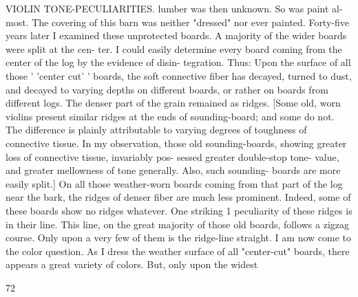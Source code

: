 \documentclass{article}
\begin{document}
VIOLIN TONE-PECULIARITIES. lumber was then unknown. So was paint al- most. The covering of this barn was neither "dressed" nor ever painted. Forty-five years later I examined these unprotected boards. A majority of the wider boards were split at the cen- ter. I could easily determine every board coming from the center of the log by the evidence of disin- tegration. Thus: Upon the surface of all those ' 'center cut' ' boards, the soft connective fiber has decayed, turned to dust, and decayed to varying depths on different boards, or rather on boards from different logs. The denser part of the grain remained as ridges. [Some old, worn violins present similar ridges at the ends of sounding-board; and some do not. The difference is plainly attributable to varying degrees of toughness of connective tissue. In my observation, those old sounding-boards, showing greater loss of connective tissue, invariably pos- sessed greater double-stop tone- value, and greater mellowness of tone generally. Also, such sounding- boards are more easily split.] On all those weather-worn boards coming from that part of the log near the bark, the ridges of denser fiber are much less prominent. Indeed, some of these boards show no ridges whatever. One striking 1 peculiarity of these ridges is in their line. This line, on the great majority of those old boards, follows a zigzag course. Only upon a very few of them is the ridge-line straight. I am now come to the color question. As I dress the weather surface of all "center-cut" boards, there appears a great variety of colors. But, only upon the widest

72
\end{document}
